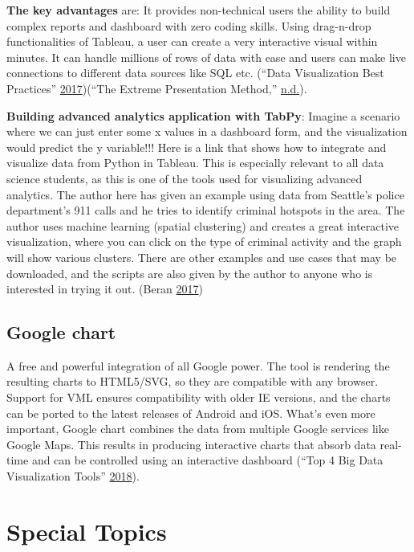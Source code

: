 \documentclass[]{book}
\begin{document}
\textbf{The key advantages} are: It provides non-technical users the ability to build complex reports and dashboard with zero coding skills. Using drag-n-drop functionalities of Tableau, a user can create a very interactive visual within minutes. It can handle millions of rows of data with ease and users can make live connections to different data sources like SQL etc. (``Data Visualization Best Practices'' \protect\hyperlink{ref-VizBP}{2017})(``The Extreme Presentation Method,'' \protect\hyperlink{ref-extremepre}{n.d.}).

\textbf{Building advanced analytics application with TabPy}: Imagine a scenario where we can just enter some x values in a dashboard form, and the visualization would predict the y variable!!!
Here is a link that shows how to integrate and visualize data from Python in Tableau. This is especially relevant to all data science students, as this is one of the tools used for visualizing advanced analytics.
The author here has given an example using data from Seattle's police department's 911 calls and he tries to identify criminal hotspots in the area. The author uses machine learning (spatial clustering) and creates a great interactive visualization, where you can click on the type of criminal activity and the graph will show various clusters.
There are other examples and use cases that may be downloaded, and the scripts are also given by the author to anyone who is interested in trying it out. (Beran \protect\hyperlink{ref-TabPy}{2017})

\hypertarget{google-chart}{%
\subsection{Google chart}\label{google-chart}}

A free and powerful integration of all Google power. The tool is rendering the resulting charts to HTML5/SVG, so they are compatible with any browser. Support for VML ensures compatibility with older IE versions, and the charts can be ported to the latest releases of Android and iOS. What's even more important, Google chart combines the data from multiple Google services like Google Maps. This results in producing interactive charts that absorb data real-time and can be controlled using an interactive dashboard (``Top 4 Big Data Visualization Tools'' \protect\hyperlink{ref-top4_viz_tools}{2018}).

\hypertarget{special-topics}{%
\section{Special Topics}\label{special-topics}}
\end{document}
